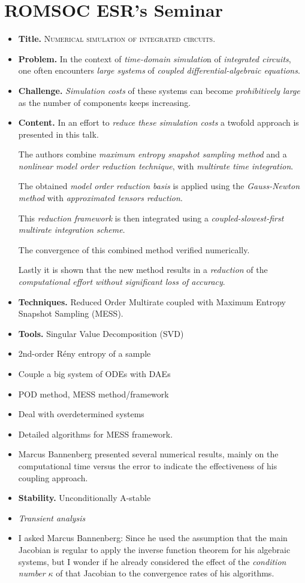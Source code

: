 \documentclass{book}
\numberwithin{equation}{section}
\begin{document}
\section{ROMSOC ESR's Seminar}
\begin{itemize}
    \item \textbf{Title.} \textsc{Numerical simulation of integrated circuits}.
    \item \textbf{Problem.} In the context of \textit{time-domain simulatio}n of \textit{integrated circuits}, one often encounters \textit{large systems} of \textit{coupled differential-algebraic equations}.
    \item \textbf{Challenge.} \textit{Simulation costs} of these systems can become \textit{prohibitively large} as the number of components keeps increasing.
    \item \textbf{Content.} In an effort to \textit{reduce these simulation costs} a twofold approach is presented in this talk.
    
    The authors combine \textit{maximum entropy snapshot sampling method} and a \textit{nonlinear model order reduction technique}, with \textit{multirate time integration}.
    
    The obtained \textit{model order reduction basis} is applied using the \textit{Gauss-Newton method} with \textit{approximated tensors reduction}.
    
    This \textit{reduction framework} is then integrated using a \textit{coupled-slowest-first multirate integration scheme}.
    
    The convergence of this combined method verified numerically.
    
    Lastly it is shown that the new method results in a \textit{reduction} of the \textit{computational effort without significant loss of accuracy}.
    \item \textbf{Techniques.} Reduced Order Multirate coupled with Maximum Entropy Snapshot Sampling (MESS).
    \item \textbf{Tools.} Singular Value Decomposition (SVD)
    \item 2nd-order R\'eny entropy of a sample
    \item Couple a big system of ODEs with DAEs
    \item POD method, MESS method/framework
    \item Deal with overdetermined systems
    \item Detailed algorithms for MESS framework.
    \item Marcus Bannenberg presented several numerical results, mainly on the computational time versus the error to indicate the effectiveness of his coupling approach.
    \item \textbf{Stability.} Unconditionally A-stable
    \item \textit{Transient analysis}
    \item I asked Marcus Bannenberg: Since he used the assumption that the main Jacobian is regular to apply the inverse function theorem for his algebraic systems, but I wonder if he already considered the effect of the \textit{condition number} $\kappa$ of that Jacobian to the convergence rates of his algorithms.
    

\end{itemize}
\end{document}
